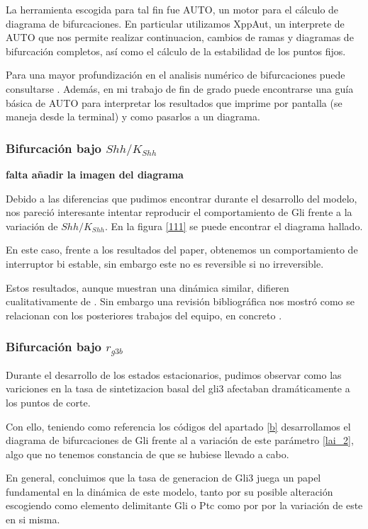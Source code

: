 La herramienta escogida para tal fin  fue AUTO, un motor para el cálculo de diagrama de bifurcaciones. En particular utilizamos XppAut, un interprete de AUTO que nos permite realizar continuacion, cambios de ramas y diagramas de bifurcación completos, así como el cálculo de la estabilidad de los puntos fijos. 

Para una mayor profundización en el analisis numérico de bifurcaciones puede consultarse \cite{meijer2012numerical}. Además, en mi trabajo de fin de grado \cite{Yo} puede encontrarse una guía básica de AUTO para interpretar los resultados que imprime por pantalla (se maneja desde la terminal) y como pasarlos a un diagrama. 


\subsubsection{Bifurcación bajo $Shh/K_{Shh}$}

\textbf{falta añadir la imagen del diagrama}

Debido a las diferencias que pudimos encontrar durante el desarrollo del modelo, nos pareció interesante intentar reproducir el comportamiento de Gli frente a la variación de $Shh/K_{Shh}$.  En la figura \ref{111} se puede encontrar el diagrama hallado.

En este caso, frente a los resultados del paper, obtenemos un comportamiento de interruptor bi estable, sin embargo este no es reversible si no irreversible. 

Estos resultados, aunque muestran una dinámica similar, difieren cualitativamente de \cite{schaffer}. Sin embargo una revisión bibliográfica nos mostró como se relacionan con los posteriores trabajos del equipo, en concreto \cite{saha}.




\subsubsection{Bifurcación bajo $r_{g3b}$}
Durante el desarrollo de los estados estacionarios, pudimos observar como las variciones en la tasa de sintetizacion basal del gli3 afectaban dramáticamente a los puntos de corte.

 Con ello, teniendo como referencia los códigos del apartado \ref{b} desarrollamos el diagrama de bifurcaciones de Gli frente al a variación de este parámetro \ref{lai_2}, algo que no tenemos constancia de que se hubiese llevado a cabo.

 En general, concluimos que la tasa de generacion de Gli3 juega un papel fundamental en la dinámica de este modelo, tanto por su posible alteración escogiendo como elemento delimitante Gli o Ptc como por por la variación de este en si misma. 
 
